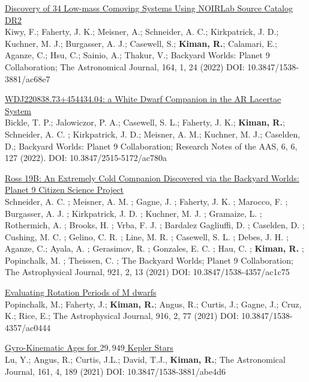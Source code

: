 \documentclass[10pt]{cv}
\begin{document}
\begin{llist}
\begin{etaremune}
  \item \href{https://ui.adsabs.harvard.edu/abs/2022AJ....164....3K/abstract}{Discovery of 34 Low-mass Comoving Systems Using NOIRLab Source Catalog DR2}\\ Kiwy, F.; Faherty, J. K.; Meisner, A.; Schneider, A. C.; Kirkpatrick, J. D.; Kuchner, M. J.; Burgasser, A. J.; Casewell, S.; \textbf{Kiman, R.}; Calamari, E.; Aganze, C.; Hsu, C.; Sainio, A.; Thakur, V.; Backyard Worlds: Planet 9 Collaboration; The Astronomical Journal, 164, 1, 24 (2022) DOI: 10.3847/1538-3881/ac68e7

  \item \href{https://ui.adsabs.harvard.edu/abs/2022RNAAS...6..127B/abstract}{WDJ220838.73+454434.04: a White Dwarf Companion in the AR Lacertae System}\\ Bickle, T. P.; Jalowiczor, P. A.; Casewell, S. L.; Faherty, J. K.; \textbf{Kiman, R.}; Schneider, A. C. ; Kirkpatrick, J. D.; Meisner, A. M.; Kuchner, M. J.; Caselden, D.; Backyard Worlds: Planet 9 Collaboration; Research Notes of the AAS, 6, 6, 127 (2022). DOI: 10.3847/2515-5172/ac780a

  \item \href{https://ui.adsabs.harvard.edu/abs/2021arXiv210805321S/abstract}{Ross 19B: An Extremely Cold Companion Discovered via the Backyard Worlds: Planet 9 Citizen Science Project}\\ Schneider, A. C. ; Meisner, A. M. ; Gagne, J. ; Faherty, J. K. ; Marocco, F. ; Burgasser, A. J. ; Kirkpatrick, J. D. ; Kuchner, M. J. ; Gramaize, L. ; Rothermich, A. ; Brooks, H. ; Vrba, F. J. ; Bardalez Gagliuffi, D. ; Caselden, D. ; Cushing, M. C. ; Gelino, C. R. ; Line, M. R. ; Casewell, S. L. ; Debes, J. H. ; Aganze, C.; Ayala, A. ; Gerasimov, R. ; Gonzales, E. C. ; Hau, C. ; \textbf{Kiman, R.} ; Popinchalk, M. ; Theissen, C. ; The Backyard Worlds; Planet 9 Collaboration; The Astrophysical Journal, 921, 2, 13 (2021) DOI: 10.3847/1538-4357/ac1c75

  \item \href{https://ui.adsabs.harvard.edu/abs/2021ApJ...916...77P/abstract}{Evaluating Rotation Periods of M dwarfs}\\ Popinchalk, M.; Faherty, J.; \textbf{Kiman, R.}; Angus, R.; Curtis, J.; Gagne, J.; Cruz, K.; Rice, E.; The Astrophysical Journal, 916, 2, 77 (2021) DOI:  10.3847/1538-4357/ac0444

  \item \href{https://ui.adsabs.harvard.edu/abs/2021arXiv210201772Y/abstract}{Gyro-Kinematic Ages for $29,949$ Kepler Stars}\\ Lu, Y.; Angus, R.; Curtis, J.L.; David, T.J., \textbf{​Kiman, R.}​; The Astronomical Journal, 161,  4, 189 (2021) DOI: 10.3847/1538-3881/abe4d6


\end{etaremune}
\end{llist}
\end{document}
